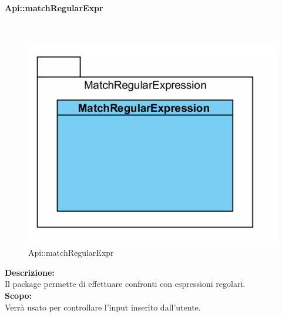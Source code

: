 \begin{samepage}
\paragraph{Api\-::match\-Regular\-Expr}\label{api-regexpr}\mbox{}\\
\begin{figure}[H]
	\centering
	\includegraphics[width=14cm]{diagrammi_img/classi_e_package/api_matchex.png}
	\caption{Api\-::matchRegularExpr}
\end{figure}
\end{samepage}
\textbf{Descrizione:}\\ 
Il package permette di effettuare confronti con espressioni regolari.\\ 
\textbf{Scopo:}\\
Verrà usato per controllare l'input inserito dall'utente.

